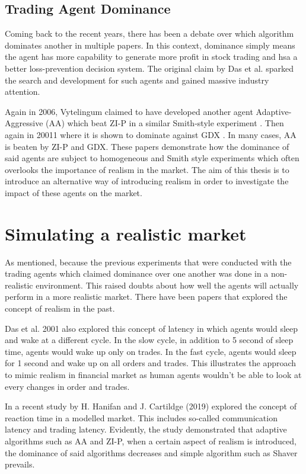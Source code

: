 \subsection{Trading Agent Dominance}
Coming back to the recent years, there has been a debate over which algorithm dominates another in multiple papers. In this context, dominance simply means the agent has more capability to generate more profit in stock trading and hsa a better loss-prevention decision system. The original claim by Das et al. sparked the search and development for such agents and gained massive industry attention. 

Again in 2006, Vytelingum claimed to have developed another agent Adaptive-Aggressive (AA) which beat ZI-P in a similar Smith-style experiment \cite{AA2006}. Then again in 20011 where it is shown to dominate against GDX \cite{deluca2011}. In many cases, AA is beaten by ZI-P and GDX. These papers demonstrate how the dominance of said agents are subject to homogeneous and Smith style experiments which often overlooks the importance of realism in the market. The aim of this thesis is to introduce an alternative way of introducing realism in order to investigate the impact of these agents on the market. 

\section{Simulating a realistic market}
As mentioned, because the previous experiments that were conducted with the trading agents which claimed dominance over one another was done in a non-realistic environment. This raised doubts about how well the agents will actually perform in a more realistic market. There have been papers that explored the concept of realism in the past. 

Das et al. 2001 \cite{das2001} also explored this concept of latency in which agents would sleep and wake at a different cycle. In the slow cycle, in addition to 5 second of sleep time, agents would wake up only on trades. In the fast cycle, agents would sleep for 1 second and wake up on all orders and trades. This illustrates the approach to mimic realism in financial market as human agents wouldn’t be able to look at every changes in order and trades. 

In a recent study by H. Hanifan and J. Cartildge (2019) \cite{foolsrush} explored the concept of reaction time in a modelled market. This includes so-called communication latency and trading latency. Evidently, the study demonstrated that adaptive algorithms such as AA and ZI-P, when a certain aspect of realism is introduced, the dominance of said algorithms decreases and simple algorithm such as Shaver prevails. 

